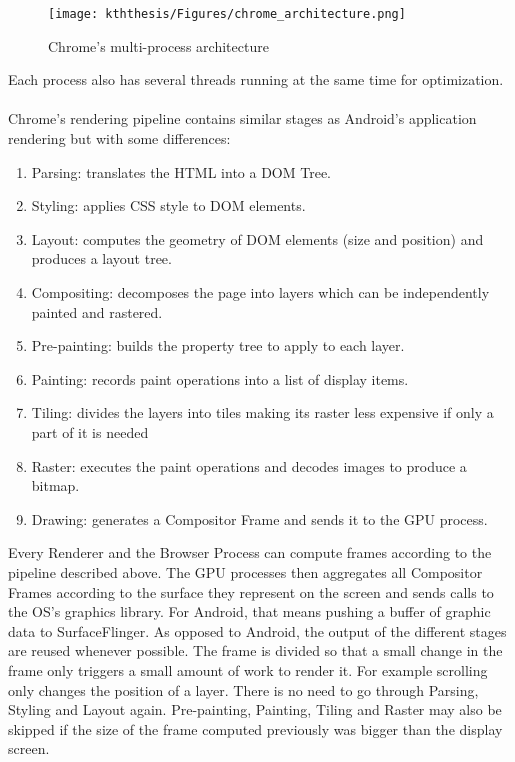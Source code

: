 \documentclass{kththesis}
\begin{document}
\begin{figure}
    \centering
    \texttt{[image: kththesis/Figures/chrome\_architecture.png]}
    \caption[Chrome's multi-process architecture]{Chrome's multi-process architecture \footnotemark}
    \label{fig:chrome_architecture}
\end{figure}


Each process also has several threads running at the same time for optimization.
 
\paragraph{}
Chrome's rendering pipeline \cite{chrome_pixel} contains similar stages as Android's application rendering but with some differences: 
\begin{enumerate}
    \item Parsing: translates the HTML into a DOM Tree.
    \item Styling: applies CSS style to DOM elements.
    \item Layout: computes the geometry of DOM elements (size and position) and produces a layout tree.
    \item Compositing: decomposes the page into layers which can be independently painted and rastered.
    \item Pre-painting: builds the property tree to apply to each layer.
    \item Painting: records paint operations into a list of display items.
    \item Tiling: divides the layers into tiles making its raster less expensive if only a part of it is needed
    \item Raster: executes the paint operations and decodes images to produce a bitmap.
    \item Drawing: generates a Compositor Frame and sends it to the GPU process.
\end{enumerate}
Every Renderer and the Browser Process can compute frames according to the pipeline described above. The GPU processes then aggregates all Compositor Frames according to the surface they represent on the screen and sends calls to the OS's graphics library. For Android, that means pushing a buffer of graphic data to SurfaceFlinger.
\newline
As opposed to Android, the output of the different stages are reused whenever possible. The frame is divided so that a small change in the frame only triggers a small amount of work to render it. 
For example scrolling only changes the position of a layer. There is no need to go through Parsing, Styling and Layout again. Pre-painting, Painting, Tiling and Raster may also be skipped if the size of the frame computed previously was bigger than the display screen.
\end{document}
